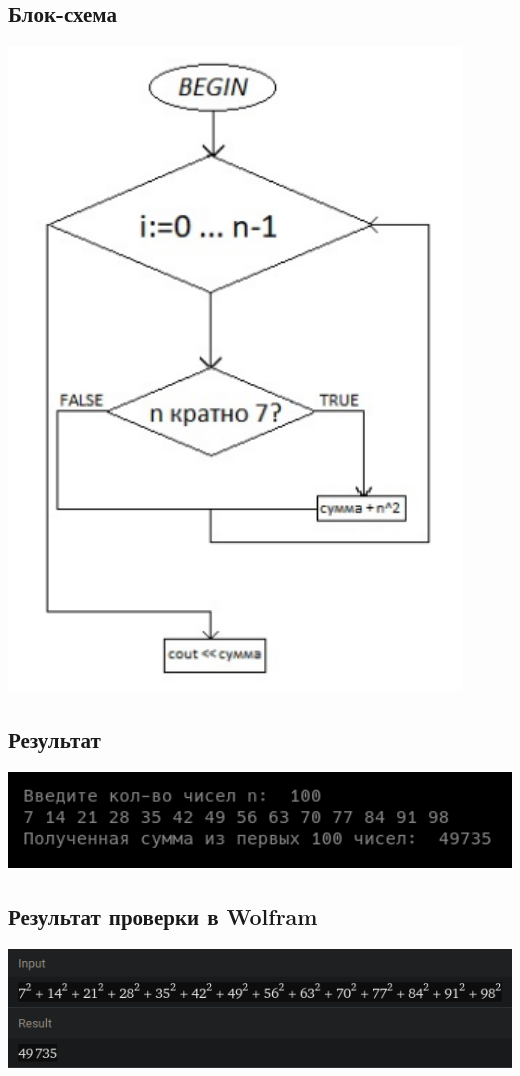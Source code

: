 \documentclass[a4paper]{article}
\begin{document}
\subsection{Блок-схема}
\includegraphics[width=0.9\textwidth]{block3.png}
\subsection{Результат}
\includegraphics[width=1\textwidth]{3.png}
\subsection{Результат проверки в Wolfram}
\includegraphics[width=1\textwidth]{wa1.png}
\newpage
\end{document}
